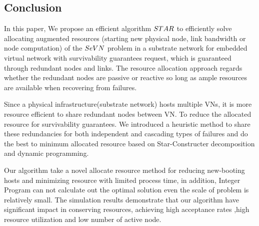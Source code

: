 \subsection{Conclusion}
In this paper, We propose an efficient algorithm $STAR$ to efficiently solve allocating augmented resources (starting new physical node, link bandwidth or node computation) of the $SeVN$  problem in a substrate network for embedded virtual network with survivability guarantees request, which is guaranteed through redundant nodes and links. The resource allocation approach regards whether the redundant nodes are passive or reactive so long as ample resources are available when recovering from failures.

Since a physical infrastructure(substrate network) hosts multiple VNs, it is more resource efficient to share redundant nodes between VN. To reduce the allocated resource for survivability guarantees. We introduced a heuristic method to share these redundancies for both independent and cascading types of failures and do the best to minimum allocated resource based on Star-Constructer decomposition and dynamic programming.

Our algorithm take a novel allocate resource method for reducing new-booting hosts and minimizing resource with limited process time, in addition, Integer Program can not calculate out the optimal solution even the scale of problem is relatively small. The simulation results demonstrate that our algorithm have significant impact in conserving resources, achieving high acceptance rates ,high resource utilization and low number of active node.
